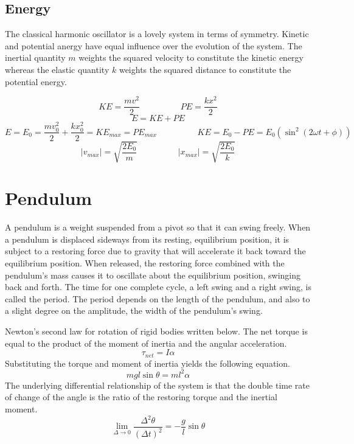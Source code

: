 \subsection{Energy}
\begin{fullwidth}
The classical harmonic oscillator is a lovely system in terms of symmetry.  Kinetic and potential anergy have equal influence over the evolution of the system.  The inertial quantity $m$ weights the squared velocity to constitute the kinetic energy whereas the elastic quantity $k$ weights the squared distance to constitute the potential energy.

$$KE=\frac{mv^2}{2}\hspace{2cm}PE=\frac{kx^2}{2}$$
$$E=KE+PE$$
$$E=E_0=\frac{mv_0^2}{2}+\frac{kx_0^2}{2}=KE_{max}=PE_{max} \hspace{2cm} KE=E_0-PE=E_0 (\sin^2(2\omega t+\phi) ) $$
$$|v_{max}|=\sqrt{\frac{2E_0}{m}} \hspace{2cm} |x_{max}|=\sqrt{\frac{2E_0}{k}}$$


\section{Pendulum}

\footnotesize{

A pendulum is a weight suspended from a pivot so that it can swing freely.  When a pendulum is displaced sideways from its resting, equilibrium position, it is subject to a restoring force due to gravity that will accelerate it back toward the equilibrium position. When released, the restoring force combined with the pendulum's mass causes it to oscillate about the equilibrium position, swinging back and forth. The time for one complete cycle, a left swing and a right swing, is called the period. The period depends on the length of the pendulum, and also to a slight degree on the amplitude, the width of the pendulum's swing.}

\end{fullwidth}

\vspace{1cm}
\footnotesize{
Newton's second law for rotation of rigid bodies written below.  The net torque is equal to the product of the moment of inertia and the angular acceleration. }
$$\tau_{net}=I\alpha$$
\footnotesize{Substituting the torque and moment of inertia yields the following equation.}
$$mgl\sin{\theta}=ml^2\alpha$$
\footnotesize{The underlying differential relationship of the system is that the double time rate of change of the angle is the ratio of the restoring torque and the inertial moment.}
$$\lim_{\Delta \rightarrow 0} \frac{\Delta^2 \theta}{(\Delta t)^2}=-\frac{g}{l}\sin\theta$$


